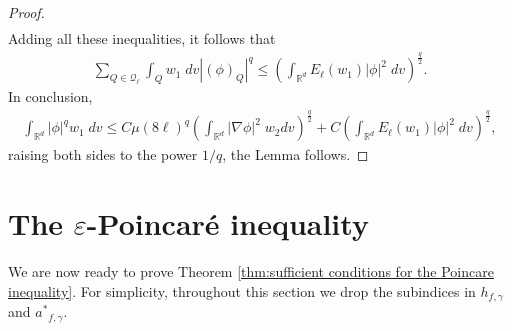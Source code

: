 \documentclass[12pt,american]{amsart}
\numberwithin{equation}{section}
\theoremstyle{plain}
\theoremstyle{definition}                  %
\def\astar{{a^*}}
\begin{document}
\begin{proof}
\begin{align*}
  \end{align*}
  Adding all these inequalities, it follows that 
  \begin{align*}  
    \sum \limits_{Q\in\mathcal{Q}_\ell} \int_{Q}w_1\;dv |(\phi)_{Q}|^q \leq \left ( \int_{\mathbb{R}^d}E_{\ell}(w_1)|\phi|^2\;dv \right )^{\frac{q}{2}}.
  \end{align*}
  In conclusion,
  \begin{align*}	
    \int_{\mathbb{R}^d}|\phi|^qw_1\;dv \leq C \mu(8\ell)^q \left (\int_{\mathbb{R}^d}|\nabla \phi|^2\;w_2 dv \right )^{\frac{q}{2}}+C\left ( \int_{\mathbb{R}^d}E_{\ell}(w_1)|\phi|^2\;dv \right )^{\frac{q}{2}},
  \end{align*}  	
  raising both sides to the power $1/q$, the Lemma follows.
\end{proof}	


\section{The $\varepsilon$-Poincar\'e inequality}\label{section:epsilon Poincare}  We are now ready to prove Theorem  \ref{thm:sufficient conditions for the Poincare inequality}. For simplicity, throughout this section we drop the subindices in $h_{f,\gamma}$ and $\astar_{f,\gamma}$.
\end{document}
